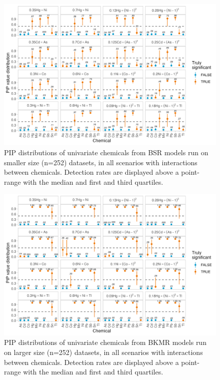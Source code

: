 \documentclass[12pt, twoside]{amherstthesis}
\begin{document}
\begin{figure}

{\centering \includegraphics[width=0.85\linewidth]{figures/ch4_ssm_univ_pips} 

}

\caption{PIP distributions of univariate chemicals from BSR models run on smaller size (n=252) datasets, in all scenarios with interactions between chemicals. Detection rates are displayed above a point-range with the median and first and third quartiles.}\label{fig:ssmunivp}
\end{figure}
\begin{figure}

{\centering \includegraphics[width=0.85\linewidth]{figures/ch4_slg_univ_pips} 

}

\caption{PIP distributions of univariate chemicals from BKMR models run on larger size (n=252) datasets, in all scenarios with interactions between chemicals. Detection rates are displayed above a point-range with the median and first and third quartiles.}\label{fig:slgunivp}
\end{figure}
\end{document}
